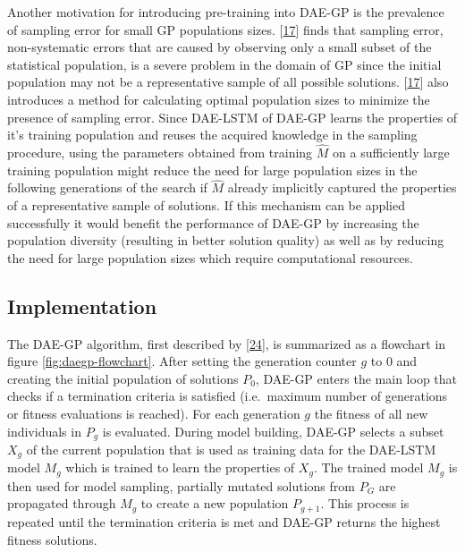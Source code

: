 \documentclass[
  11pt,
]{article}
\begin{document}
Another motivation for introducing pre-training into DAE-GP is the prevalence of sampling error for small GP populations sizes.
{[}\protect\hyperlink{ref-sampling_err_gp}{17}{]} finds that sampling error, non-systematic errors that are caused by observing only a small subset of the statistical population, is a severe problem in the domain of GP since the initial population may not be a representative sample of all possible solutions.
{[}\protect\hyperlink{ref-sampling_err_gp}{17}{]} also introduces a method for calculating optimal population sizes to minimize the presence of sampling error.
Since DAE-LSTM of DAE-GP learns the properties of it's training population and reuses the acquired knowledge in the sampling procedure, using the parameters obtained from training \(\hat{M}\) on a sufficiently large training population might reduce the need for large population sizes in the following generations of the search if \(\hat{M}\) already implicitly captured the properties of a representative sample of solutions.
If this mechanism can be applied successfully it would benefit the performance of DAE-GP by increasing the population diversity (resulting in better solution quality) as well as by reducing the need for large population sizes which require computational resources.

\hypertarget{implementation}{%
\subsection{Implementation}\label{implementation}}

The DAE-GP algorithm, first described by {[}\protect\hyperlink{ref-dae-gp_2020_rtree}{24}{]}, is summarized as a flowchart in figure \ref{fig:daegp-flowchart}.
After setting the generation counter \(g\) to \(0\) and creating the initial population of solutions \(P_0\), DAE-GP enters the main loop that checks if a termination criteria is satisfied (i.e.~maximum number of generations or fitness evaluations is reached).
For each generation \(g\) the fitness of all new individuals in \(P_g\) is evaluated. During model building, DAE-GP selects a subset \(X_g\) of the current population that is used as training data for the DAE-LSTM model \(M_g\) which is trained to learn the properties of \(X_g\).
The trained model \(M_g\) is then used for model sampling, partially mutated solutions from \(P_G\) are propagated through \(M_g\) to create a new population \(P_{g+1}\).
This process is repeated until the termination criteria is met and DAE-GP returns the highest fitness solutions.
\end{document}
